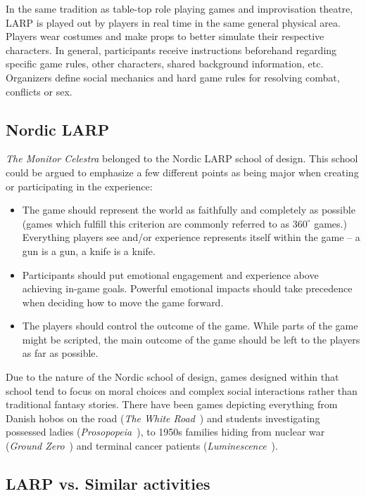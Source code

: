 In the same tradition as table-top role playing games and improvisation theatre, LARP is played out by players in real time in the same general physical area. Players wear costumes and make props to better simulate their respective characters. In general, participants receive instructions beforehand regarding specific game rules, other characters, shared background information, etc. Organizers define social mechanics and hard game rules for resolving combat, conflicts or sex. 

\subsection{Nordic LARP}

\emph{The Monitor Celestra} belonged to the Nordic LARP school of design. This school could be argued to emphasize a few different points as being major when creating or participating in the experience: 

\begin{itemize}
    \item The game should represent the world as faithfully and completely as possible (games which fulfill this criterion are commonly referred to as $360^{\circ}$ games.) Everything players see and/or experience represents itself within the game -- a gun is a gun, a knife is a knife.
\item Participants should put emotional engagement and experience above achieving in-game goals. Powerful emotional impacts should take precedence when deciding how to move the game forward.
\item The players should control the outcome of the game. While parts of the game might be scripted, the main outcome of the game should be left to the players as far as possible.
\end{itemize}

Due to the nature of the Nordic school of design, games designed within that school tend to focus on moral choices and complex social interactions rather than traditional fantasy stories. There have been games depicting everything from Danish hobos on the road (\emph{The White Road}~\cite{pedersen2008}) and students investigating possessed ladies (\emph{Prosopopeia}~\cite{jonsson2006prosopopeia, montola2006prosopopeia}), to 1950s families hiding from nuclear war (\emph{Ground Zero}~\cite{nordiclarp}) and terminal cancer patients (\emph{Luminescence}~\cite{nordiclarp}).

\subsection{LARP vs. Similar activities}

